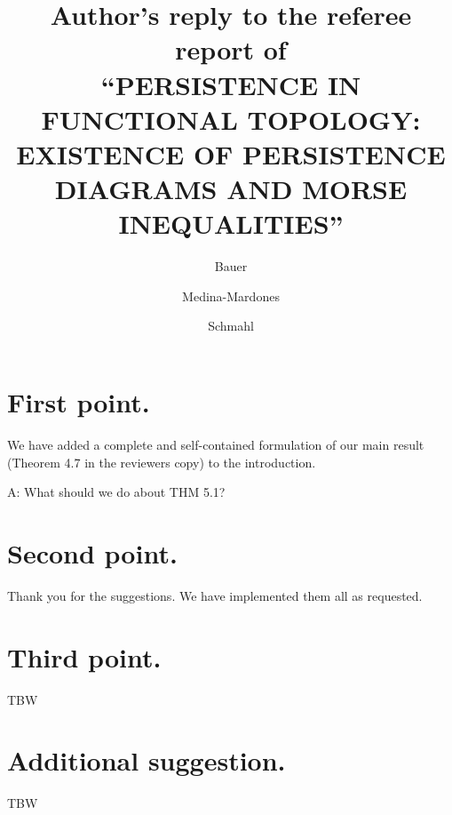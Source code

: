 \documentclass{article}
\title{Author's reply to the referee report of \\ \textsc{
    ``PERSISTENCE IN FUNCTIONAL TOPOLOGY: EXISTENCE OF PERSISTENCE DIAGRAMS AND MORSE INEQUALITIES''
    }
}
\author{Bauer \and Medina-Mardones \and Schmahl}
\begin{document}
	\maketitle
	\section{First point.} We have added a complete and self-contained formulation of our main result (Theorem 4.7 in the reviewers copy) to the introduction.

	A: What should we do about THM 5.1?

	\section{Second point.} Thank you for the suggestions.
	We have implemented them all as requested.

	\section{Third point.} TBW

	\section{Additional suggestion.} TBW
\end{document}
